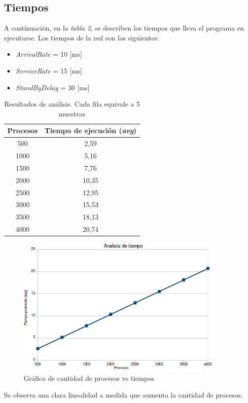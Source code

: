 \documentclass{article}
\begin{document}
    \subsection{Tiempos}
    A continuación, en la \emph{tabla 2}, se describen los tiempos que lleva el programa en 
    ejecutarse. Los tiempos de la red son los siguientes: \par
    \begin{itemize}
        \item \emph{ArrivalRate} = 10 [ms]
        \item \emph{ServiceRate} = 15 [ms]
        \item \emph{StandByDelay} = 30 [ms]
    \end{itemize} 
    \begin{center}
        \begin{table}[H]
            \centering
            \begin{tabular}{||c|c||} 
                \hline
                Procesos & Tiempo de ejecución (\emph{avg}) \\ [0.5ex] 
                \hline\hline
                500 & 2,59 \\ 
                \hline
                1000 & 5,16 \\
                \hline
                1500 & 7,76 \\
                \hline
                2000 & 10,35 \\
                \hline
                2500 & 12,95 \\
                \hline
                3000 & 15,53 \\
                \hline
                3500 & 18,13 \\
                \hline
                4000 & 20,74 \\
                \hline
            \end{tabular}
            \caption{Resultados de análisis. Cada fila equivale a 5 muestras}
        \end{table}
    \end{center}
    \begin{figure}[H]
        \includegraphics[width=0.9\textwidth, center]{tiempos.png}
        \caption{Gráfica de cantidad de procesos vs tiempos}
    \end{figure}
    Se observa una clara linealidad a medida que aumenta la cantidad de procesos.
    \newpage 
\end{document}
